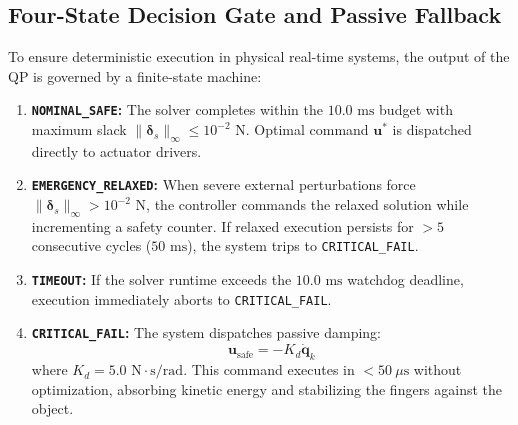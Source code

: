 \subsection{Four-State Decision Gate and Passive Fallback}
To ensure deterministic execution in physical real-time systems, the output of the QP is governed by a finite-state machine:
\begin{enumerate}
    \item \textbf{\texttt{NOMINAL\_SAFE}:} The solver completes within the $10.0\text{ ms}$ budget with maximum slack $\|\boldsymbol{\delta}_s\|_\infty \le 10^{-2}\text{ N}$. Optimal command $\mathbf{u}^*$ is dispatched directly to actuator drivers.
    \item \textbf{\texttt{EMERGENCY\_RELAXED}:} When severe external perturbations force $\|\boldsymbol{\delta}_s\|_\infty > 10^{-2}\text{ N}$, the controller commands the relaxed solution while incrementing a safety counter. If relaxed execution persists for $> 5$ consecutive cycles ($50\text{ ms}$), the system trips to \texttt{CRITICAL\_FAIL}.
    \item \textbf{\texttt{TIMEOUT}:} If the solver runtime exceeds the $10.0\text{ ms}$ watchdog deadline, execution immediately aborts to \texttt{CRITICAL\_FAIL}.
    \item \textbf{\texttt{CRITICAL\_FAIL}:} The system dispatches passive damping:
    \begin{equation}
        \mathbf{u}_{\text{safe}} = -K_d \dot{\mathbf{q}}_k
    \end{equation}
    where $K_d = 5.0\text{ N}\cdot\text{s/rad}$. This command executes in $< 50\ \mu\text{s}$ without optimization, absorbing kinetic energy and stabilizing the fingers against the object.
\end{enumerate}
